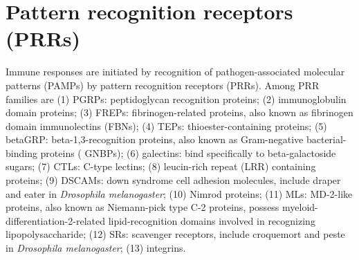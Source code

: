 \documentclass[11pt]{article}
\begin{document}
\begin{sloppypar}
\section{Pattern recognition receptors (PRRs)}
Immune responses are initiated by recognition of pathogen-associated molecular patterns (PAMPs) by pattern recognition receptors (PRRs). 
Among PRR families are 
\newline
(1) PGRPs: peptidoglycan recognition proteins; \newline
(2) immunoglobulin domain proteins; \newline
(3) FREPs: fibrinogen-related proteins, also known as fibrinogen domain immunolectins (FBNs); \newline
(4) TEPs: thioester-containing proteins; \newline
(5) betaGRP: beta-1,3-recognition proteins, also known as Gram-negative bacterial-binding proteins ( GNBPs); \newline
(6) galectins: bind specifically to beta-galactoside sugars; \newline
(7) CTLs: C-type lectins; \newline
(8) leucin-rich repeat (LRR) containing proteins; \newline
(9) DSCAMs: down syndrome cell adhesion molecules, include draper and eater in \textit{Drosophila melanogaster}; \newline
(10) Nimrod proteins; \newline
(11) MLs: MD-2-like proteins, also known as Niemann-pick type C-2 proteins, possess myeloid-differentiation-2-related lipid-recognition domains involved in recognizing lipopolysaccharide; \newline
(12) SRs: scavenger receptors, include croquemort and peste in \textit{Drosophila melanogaster}; \newline
(13) integrins.


\end{sloppypar}
\end{document}
